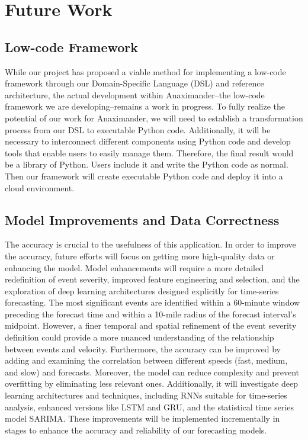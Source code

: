 \section{Future Work}
\subsection{Low-code Framework}

While our project has proposed a viable method for implementing a low-code framework through our Domain-Specific Language (DSL) and reference architecture, the actual development within Anaximander--the low-code framework we are developing--remains a work in progress. To fully realize the potential of our work for Anaximander, we will need to establish a transformation process from our DSL to executable Python code. Additionally, it will be necessary to interconnect different components using Python code and develop tools that enable users to easily manage them. Therefore, the final result would be a library of Python. Users include it and write the Python code as normal. Then our framework will create executable Python code and deploy it into a cloud environment.

\subsection{Model Improvements and Data Correctness}
The accuracy is crucial to the usefulness of this application. In order to improve the accuracy, future efforts will focus on getting more high-quality data or enhancing the model. Model enhancements will require a more detailed redefinition of event severity, improved feature engineering and selection, and the exploration of deep learning architectures designed explicitly for time-series forecasting. The most significant events are identified within a 60-minute window preceding the forecast time and within a 10-mile radius of the forecast interval's midpoint. However, a finer temporal and spatial refinement of the event severity definition could provide a more nuanced understanding of the relationship between events and velocity.
Furthermore, the accuracy can be improved by adding and examining the correlation between different speeds (fast, medium, and slow) and forecasts. Moreover, the model can reduce complexity and prevent overfitting by eliminating less relevant ones. Additionally, it will investigate deep learning architectures and techniques, including RNNs suitable for time-series analysis, enhanced versions like LSTM and GRU, and the statistical time series model SARIMA. These improvements will be implemented incrementally in stages to enhance the accuracy and reliability of our forecasting models.

